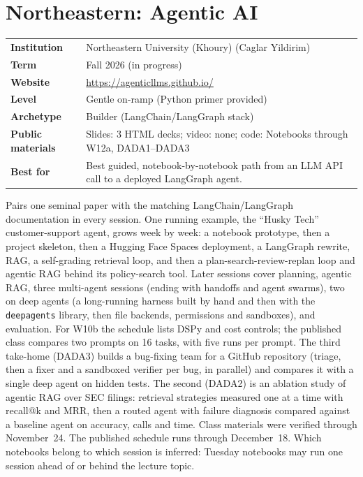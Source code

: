 \documentclass[10pt,oneside]{report}
\begin{document}
\chapter{Northeastern: Agentic AI}\hypertarget{course-NEU}{}
{\small\begin{tabularx}{\linewidth}{@{}>{\bfseries}l X@{}}\toprule
Institution & Northeastern University (Khoury) (Caglar Yildirim)\\
Term & Fall 2026 (in progress)\\
Website & \href{https://agenticllms.github.io/}{https://agenticllms.github.io/}\\
Level & Gentle on-ramp (Python primer provided)\\
Archetype & Builder (LangChain/LangGraph stack)\\
Public materials & Slides: 3 HTML decks; video: none; code: Notebooks through W12a, DADA1--DADA3\\
Best for & Best guided, notebook-by-notebook path from an LLM API call to a deployed LangGraph agent.\\
\bottomrule\end{tabularx}}

Pairs one seminal paper with the matching LangChain/LangGraph documentation in every session.
One running example, the ``Husky Tech'' customer-support agent, grows week by week: a notebook prototype, then a project skeleton, then a Hugging Face Spaces deployment, a LangGraph rewrite, RAG, a self-grading retrieval loop, and then a plan-search-review-replan loop and agentic RAG behind its policy-search tool.
Later sessions cover planning, agentic RAG, three multi-agent sessions (ending with handoffs and agent swarms), two on deep agents (a long-running harness built by hand and then with the \texttt{deepagents} library, then file backends, permissions and sandboxes), and evaluation. For W10b the schedule lists DSPy and cost controls; the published class compares two prompts on 16 tasks, with five runs per prompt.
The third take-home (DADA3) builds a bug-fixing team for a GitHub repository (triage, then a fixer and a sandboxed verifier per bug, in parallel) and compares it with a single deep agent on hidden tests. The second (DADA2) is an ablation study of agentic RAG over SEC filings: retrieval strategies measured one at a time with recall@k and MRR, then a routed agent with failure diagnosis compared against a baseline agent on accuracy, calls and time.
Class materials were verified through November~24. The published schedule runs through December~18. Which notebooks belong to which session is inferred: Tuesday notebooks may run one session ahead of or behind the lecture topic.
\end{document}
